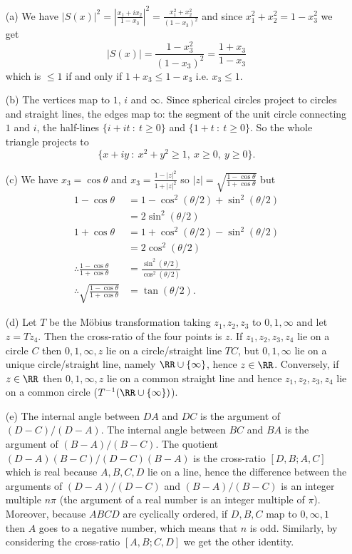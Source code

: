 \documentclass[12pt]{article}
\begin{document}
\begin{answer}
  \begin{enumerate}
  \item[(a)] We have $|S(x)|^2=\left|\frac{x_1+ix_2}{1-x_3}\right|^2=\frac{x_1^2+x_2^2}{(1-x_3)^2}$ and since $x_1^2+x_2^2=1-x_3^2$ we get
    \[|S(x)|=\frac{1-x_3^2}{(1-x_3)^2}=\frac{1+x_3}{1-x_3}\]
    which is $\leq 1$ if and only if $1+x_3\leq 1-x_3$ i.e. $x_3\leq 1$.
  \item[(b)] The vertices map to $1$, $i$ and $\infty$. Since spherical circles project to circles and straight lines, the edges map to: the segment of the unit circle connecting $1$ and $i$, the half-lines $\{i+it\ :\ t\geq 0\}$ and $\{1+t\ :\ t\geq 0\}$. So the whole triangle projects to
    \[\{x+iy\ :\ x^2+y^2\geq 1,\ x\geq 0,\ y\geq 0\}.\]
  \item[(c)] We have $x_3=\cos\theta$ and $x_3=\frac{1-|z|^2}{1+|z|^2}$ so $|z|=\sqrt{\frac{1-\cos\theta}{1+\cos\theta}}$ but
    \begin{align*}
      1-\cos\theta&=1-\cos^2(\theta/2)+\sin^2(\theta/2)\\
      &=2\sin^2(\theta/2)\\
      1+\cos\theta&=1+\cos^2(\theta/2)-\sin^2(\theta/2)\\
      &=2\cos^2(\theta/2)\\
      \therefore\frac{1-\cos\theta}{1+\cos\theta}&=\frac{\sin^2(\theta/2)}{\cos^2(\theta/2)}\\
      \therefore\sqrt{\frac{1-\cos\theta}{1+\cos\theta}}&=\tan(\theta/2).
    \end{align*}
  \item[(d)] Let $T$ be the M\"obius transformation taking $z_1,z_2,z_3$ to $0,1,\infty$ and let $z=Tz_4$. Then the cross-ratio of the four points is $z$. If $z_1,z_2,z_3,z_4$ lie on a circle $C$ then $0,1,\infty,z$ lie on a circle/straight line $TC$, but $0,1,\infty$ lie on a unique circle/straight line, namely $\RR\cup\{\infty\}$, hence $z\in\RR$. Conversely, if $z\in\RR$ then $0,1,\infty,z$ lie on a common straight line and hence $z_1,z_2,z_3,z_4$ lie on a common circle ($T^{-1}(\RR\cup\{\infty\})$).
  \item[(e)] The internal angle between $DA$ and $DC$ is the argument of $(D-C)/(D-A)$. The internal angle between $BC$ and $BA$ is the argument of $(B-A)/(B-C)$. The quotient $(D-A)(B-C)/(D-C)(B-A)$ is the cross-ratio $[D,B;A,C]$ which is real because $A,B,C,D$ lie on a line, hence the difference between the arguments of $(D-A)/(D-C)$ and $(B-A)/(B-C)$ is an integer multiple $n\pi$ (the argument of a real number is an integer multiple of $\pi$). Moreover, because $ABCD$ are cyclically ordered, if $D,B,C$ map to $0,\infty,1$ then $A$ goes to a negative number, which means that $n$ is odd. Similarly, by considering the cross-ratio $[A,B;C,D]$ we get the other identity.
  \end{enumerate}
\end{answer}
\end{document}
